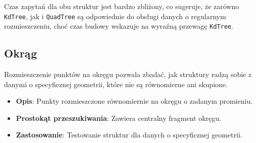 \documentclass[12pt]{article}
\begin{document}
\noindent Czas zapytań dla obu struktur jest bardzo zbliżony, co sugeruje, że zarówno \texttt{KdTree}, jak i \texttt{QuadTree} są odpowiednie do obsługi danych o regularnym rozmieszczeniu, choć czas budowy wskazuje na wyraźną przewagę \texttt{KdTree}.



\newpage

\subsection{Okrąg}
Rozmieszczenie punktów na okręgu pozwala zbadać, jak struktury radzą sobie z danymi o specyficznej geometrii, które nie są równomierne ani skupione.
\begin{itemize}
    \item \textbf{Opis}: Punkty rozmieszczone równomiernie na okręgu o zadanym promieniu.
    \item \textbf{Prostokąt przeszukiwania}: Zawiera centralny fragment okręgu.
    \item \textbf{Zastosowanie}: Testowanie struktur dla danych o specyficznej geometrii.
\end{itemize}
\end{document}
